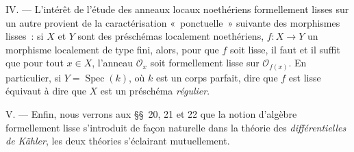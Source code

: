 \begin{env}[19.0.2]
\medskip\noindent IV. --- L'intérêt de l'étude des anneaux locaux
noethériens formellement lisses sur un autre provient de la caractérisation
«~ponctuelle~» suivante des morphismes lisses~: si $X$ et $Y$ sont des
préschémas localement noethériens, $f:X\to Y$ un morphisme localement de type
fini, alors, pour que $f$ soit lisse, il faut et il suffit que pour tout
$x\in X$, l'anneau $\mathcal O_x$ soit formellement lisse sur
$\mathcal O_{f(x)}$. En particulier, si $Y=\operatorname{Spec}(k)$, où $k$ est
un corps parfait, dire que $f$ est lisse équivaut à dire que $X$ est un
préschéma \emph{régulier}.

\medskip\noindent V. --- Enfin, nous verrons aux §§~20, 21 et 22 que
la notion d'algèbre formellement lisse s'introduit de façon naturelle dans la
théorie des \emph{différentielles de Kähler}, les deux théories s'éclairant
mutuellement.
\end{env}

